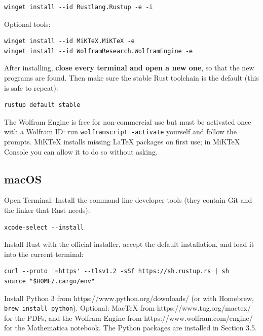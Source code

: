 \documentclass[11pt]{article}
\begin{document}
\begin{Verbatim}[fontsize=\small]
winget install --id Rustlang.Rustup -e -i
\end{Verbatim}

Optional tools:

\begin{Verbatim}[fontsize=\small]
winget install --id MiKTeX.MiKTeX -e
winget install --id WolframResearch.WolframEngine -e
\end{Verbatim}

After installing, \textbf{close every terminal and open a new one}, so that the new programs are found. Then make sure the stable Rust toolchain is the default (this is safe to repeat):

\begin{Verbatim}[fontsize=\small]
rustup default stable
\end{Verbatim}

The Wolfram Engine is free for non-commercial use but must be activated once with a Wolfram ID: run \texttt{wolframs\allowbreak{}cript -a\allowbreak{}ctivate} yourself and follow the prompts. MiKTeX installs missing LaTeX packages on first use; in MiKTeX Console you can allow it to do so without asking.

\subsection{macOS}

Open Terminal. Install the command line developer tools (they contain Git and the linker that Rust needs):

\begin{Verbatim}[fontsize=\small]
xcode-select --install
\end{Verbatim}

Install Rust with the official installer, accept the default installation, and load it into the current terminal:

\begin{Verbatim}[fontsize=\small]
curl --proto '=https' --tlsv1.2 -sSf https://sh.rustup.rs | sh
source "$HOME/.cargo/env"
\end{Verbatim}

Install Python 3 from https://www.python.org/downloads/ (or with Homebrew, \texttt{brew ins\allowbreak{}tall pyt\allowbreak{}hon}). Optional: MacTeX from https://www.tug.org/mactex/ for the PDFs, and the Wolfram Engine from https://www.wolfram.com/engine/ for the Mathematica notebook. The Python packages are installed in Section 3.5.
\end{document}
